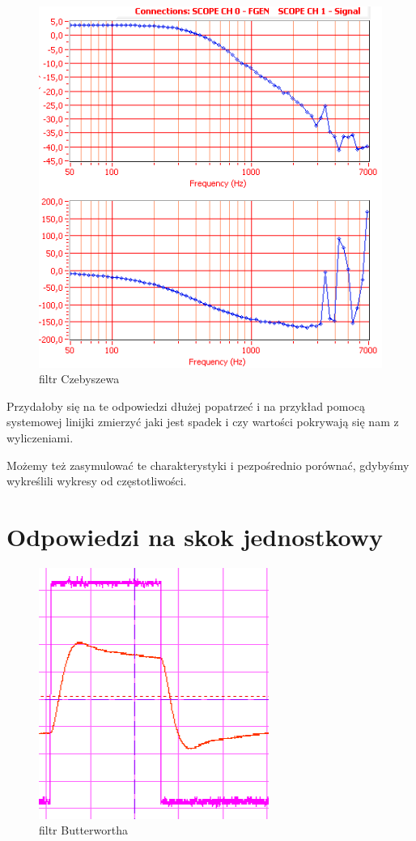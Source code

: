 \documentclass[a4paper,11pt]{article}
\begin{document}
\begin{figure}[H]
\begin{center}
\includegraphics{obrazki/trzebieszow1bialy.png}
\end{center}
\caption{filtr Czebyszewa}
\end{figure}


Przydałoby się na te odpowiedzi dłużej popatrzeć i na przykład
pomocą systemowej linijki zmierzyć jaki jest spadek i czy wartości
pokrywają się nam z wyliczeniami.

Możemy też zasymulować te charakterystyki i pezpośrednio porównać,
gdybyśmy wykreślili wykresy od częstotliwości.

\section{Odpowiedzi na skok jednostkowy}


\begin{figure}[H]
\begin{center}
\includegraphics{obrazki/batman1prostybialymod.png}
\end{center}
\caption{filtr Butterwortha}
\end{figure}
\end{document}
